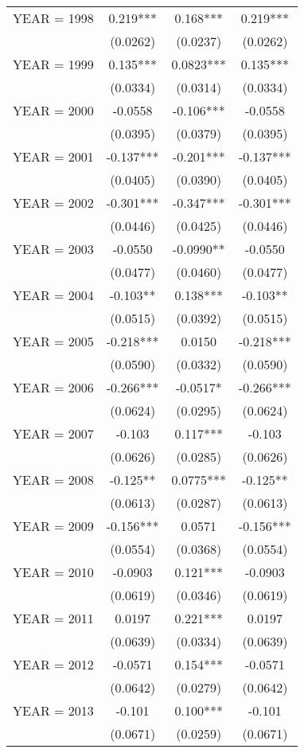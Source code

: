 \begin{tabular}{lccc}
YEAR = 1998 & 0.219*** & 0.168*** & 0.219*** \\
 & (0.0262) & (0.0237) & (0.0262) \\
YEAR = 1999 & 0.135*** & 0.0823*** & 0.135*** \\
 & (0.0334) & (0.0314) & (0.0334) \\
YEAR = 2000 & -0.0558 & -0.106*** & -0.0558 \\
 & (0.0395) & (0.0379) & (0.0395) \\
YEAR = 2001 & -0.137*** & -0.201*** & -0.137*** \\
 & (0.0405) & (0.0390) & (0.0405) \\
YEAR = 2002 & -0.301*** & -0.347*** & -0.301*** \\
 & (0.0446) & (0.0425) & (0.0446) \\
YEAR = 2003 & -0.0550 & -0.0990** & -0.0550 \\
 & (0.0477) & (0.0460) & (0.0477) \\
YEAR = 2004 & -0.103** & 0.138*** & -0.103** \\
 & (0.0515) & (0.0392) & (0.0515) \\
YEAR = 2005 & -0.218*** & 0.0150 & -0.218*** \\
 & (0.0590) & (0.0332) & (0.0590) \\
YEAR = 2006 & -0.266*** & -0.0517* & -0.266*** \\
 & (0.0624) & (0.0295) & (0.0624) \\
YEAR = 2007 & -0.103 & 0.117*** & -0.103 \\
 & (0.0626) & (0.0285) & (0.0626) \\
YEAR = 2008 & -0.125** & 0.0775*** & -0.125** \\
 & (0.0613) & (0.0287) & (0.0613) \\
YEAR = 2009 & -0.156*** & 0.0571 & -0.156*** \\
 & (0.0554) & (0.0368) & (0.0554) \\
YEAR = 2010 & -0.0903 & 0.121*** & -0.0903 \\
 & (0.0619) & (0.0346) & (0.0619) \\
YEAR = 2011 & 0.0197 & 0.221*** & 0.0197 \\
 & (0.0639) & (0.0334) & (0.0639) \\
YEAR = 2012 & -0.0571 & 0.154*** & -0.0571 \\
 & (0.0642) & (0.0279) & (0.0642) \\
YEAR = 2013 & -0.101 & 0.100*** & -0.101 \\
 & (0.0671) & (0.0259) & (0.0671) \\

\end{tabular}
